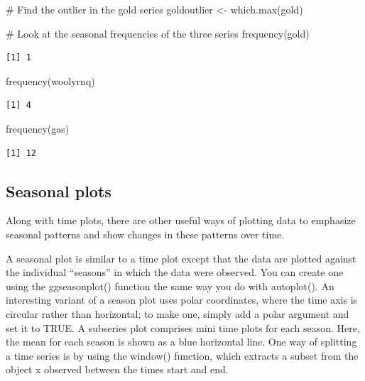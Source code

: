 \documentclass[
  letterpaper,
  DIV=11,
  numbers=noendperiod]{scrartcl}
\newenvironment{Shaded}{\begin{snugshade}}{\end{snugshade}}
\newcommand{\CommentTok}[1]{\textcolor[rgb]{0.37,0.37,0.37}{#1}}
\newcommand{\FunctionTok}[1]{\textcolor[rgb]{0.28,0.35,0.67}{#1}}
\newcommand{\NormalTok}[1]{\textcolor[rgb]{0.00,0.23,0.31}{#1}}
\newcommand{\OtherTok}[1]{\textcolor[rgb]{0.00,0.23,0.31}{#1}}
\begin{document}
\begin{Shaded}
\begin{Highlighting}[]
\CommentTok{\# Find the outlier in the gold series}
\NormalTok{goldoutlier }\OtherTok{\textless{}{-}} \FunctionTok{which.max}\NormalTok{(gold)}

\CommentTok{\# Look at the seasonal frequencies of the three series}
\FunctionTok{frequency}\NormalTok{(gold)}
\end{Highlighting}
\end{Shaded}

\begin{verbatim}
[1] 1
\end{verbatim}

\begin{Shaded}
\begin{Highlighting}[]
\FunctionTok{frequency}\NormalTok{(woolyrnq)}
\end{Highlighting}
\end{Shaded}

\begin{verbatim}
[1] 4
\end{verbatim}

\begin{Shaded}
\begin{Highlighting}[]
\FunctionTok{frequency}\NormalTok{(gas)}
\end{Highlighting}
\end{Shaded}

\begin{verbatim}
[1] 12
\end{verbatim}

\hypertarget{seasonal-plots}{%
\subsection{Seasonal plots}\label{seasonal-plots}}

Along with time plots, there are other useful ways of plotting data to
emphasize seasonal patterns and show changes in these patterns over
time.

A seasonal plot is similar to a time plot except that the data are
plotted against the individual ``seasons'' in which the data were
observed. You can create one using the ggseasonplot() function the same
way you do with autoplot(). An interesting variant of a season plot uses
polar coordinates, where the time axis is circular rather than
horizontal; to make one, simply add a polar argument and set it to TRUE.
A subseries plot comprises mini time plots for each season. Here, the
mean for each season is shown as a blue horizontal line. One way of
splitting a time series is by using the window() function, which
extracts a subset from the object x observed between the times start and
end.
\end{document}
